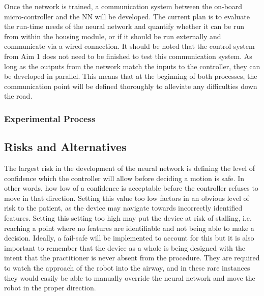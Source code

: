 		Once the network is trained, a communication system between the on-board micro-controller and the NN will be developed. The current plan is to evaluate the run-time needs of the neural network and quantify whether it can be run from within the housing module, or if it should be run externally and communicate via a wired connection. It should be noted that the control system from Aim 1 does not need to be finished to test this communication system. As long as the outputs from the network match the inputs to the controller, they can be developed in parallel. This means that at the beginning of both processes, the communication point will be defined thoroughly to alleviate any difficulties down the road.
	
	\subsubsection{Experimental Process}

\subsection{Risks and Alternatives}

	The largest risk in the development of the neural network is defining the level of confidence which the controller will allow before deciding a motion is safe. In other words, how low of a confidence is acceptable before the controller refuses to move in that direction. Setting this value too low factors in an obvious level of risk to the patient, as the device may navigate towards incorrectly identified features. Setting this setting too high may put the device at risk of stalling, i.e. reaching a point where no features are identifiable and not being able to make a decision. Ideally, a fail-safe will be implemented to account for this but it is also important to remember that the device as a whole is being designed with the intent that the practitioner is never absent from the procedure. They are required to watch the approach of the robot into the airway, and in these rare instances they would easily be able to manually override the neural network and move the robot in the proper direction.